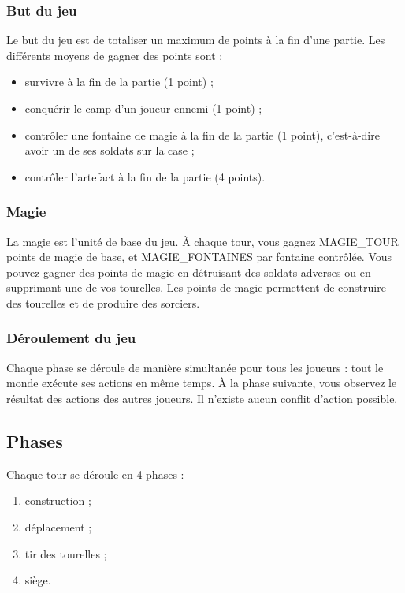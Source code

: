 \subsubsection{But du jeu}\label{but-du-jeu}

Le but du jeu est de totaliser un maximum de points à la fin d'une
partie. Les différents moyens de gagner des points sont :

\begin{itemize}
\itemsep1pt\parskip0pt
\item
  survivre à la fin de la partie (1 point) ;
\item
  conquérir le camp d'un joueur ennemi (1 point) ;
\item
  contrôler une fontaine de magie à la fin de la partie (1 point), c'est-à-dire avoir un de ses soldats sur la case ;
\item
  contrôler l'artefact à la fin de la partie (4 points).
\end{itemize}

\subsubsection{Magie}\label{magie}

La magie est l'unité de base du jeu. À chaque tour, vous gagnez
MAGIE\_TOUR points de magie de base, et MAGIE\_FONTAINES par fontaine
contrôlée. Vous pouvez gagner des points de magie en détruisant des soldats adverses ou en supprimant une de vos tourelles. Les points de magie permettent de construire des tourelles et de produire des sorciers.

\subsubsection{Déroulement du jeu}\label{duxe9roulement-du-jeu}

Chaque phase se déroule de manière simultanée pour tous les joueurs :
tout le monde exécute ses actions en même temps. À la phase suivante,
vous observez le résultat des actions des autres joueurs. Il n'existe aucun
conflit d'action possible.

\subsection{Phases}\label{phases}

Chaque tour se déroule en 4 phases :

\begin{enumerate}
\item construction ;
\item déplacement ;
\item tir des tourelles ;
\item siège.
\end{enumerate}


